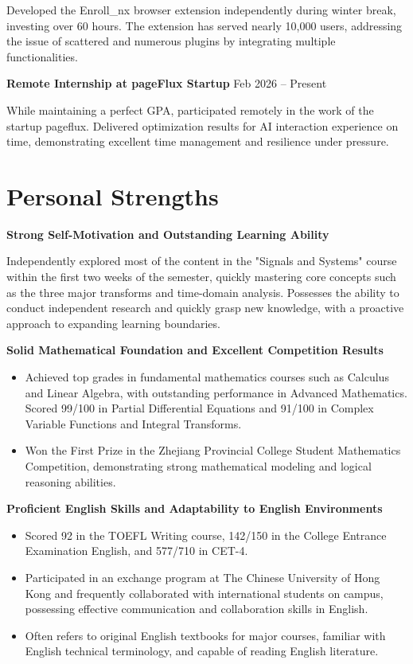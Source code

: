 \documentclass[11pt]{article}
\newlength{\interProjectSpacing}
\newcommand{\projectsep}{\vspace{\interProjectSpacing}}
\begin{document}
Developed the Enroll\_nx browser extension independently during winter break, investing over 60 hours. The extension has served nearly 10,000 users, addressing the issue of scattered and numerous plugins by integrating multiple functionalities.

\textbf{Remote Internship at pageFlux Startup} \hfill Feb 2026 -- Present

While maintaining a perfect GPA, participated remotely in the work of the startup pageflux. Delivered optimization results for AI interaction experience on time, demonstrating excellent time management and resilience under pressure.

\section{\makebox[\widthof{\faUsers}][c]{\color{CVBlue}\faUsers} Personal Strengths}

\textbf{Strong Self-Motivation and Outstanding Learning Ability}

Independently explored most of the content in the "Signals and Systems" course within the first two weeks of the semester, quickly mastering core concepts such as the three major transforms and time-domain analysis. Possesses the ability to conduct independent research and quickly grasp new knowledge, with a proactive approach to expanding learning boundaries.

\textbf{Solid Mathematical Foundation and Excellent Competition Results}
\begin{itemize}[leftmargin=*,nosep]
    \item Achieved top grades in fundamental mathematics courses such as Calculus and Linear Algebra, with outstanding performance in Advanced Mathematics. Scored 99/100 in Partial Differential Equations and 91/100 in Complex Variable Functions and Integral Transforms.
    \item Won the First Prize in the Zhejiang Provincial College Student Mathematics Competition, demonstrating strong mathematical modeling and logical reasoning abilities.
\end{itemize}

\textbf{Proficient English Skills and Adaptability to English Environments}
\begin{itemize}[leftmargin=*,nosep]
    \item Scored 92 in the TOEFL Writing course, 142/150 in the College Entrance Examination English, and 577/710 in CET-4.
    \item Participated in an exchange program at The Chinese University of Hong Kong and frequently collaborated with international students on campus, possessing effective communication and collaboration skills in English.
    \item Often refers to original English textbooks for major courses, familiar with English technical terminology, and capable of reading English literature.
\end{itemize}

\projectsep
 
\end{document}

